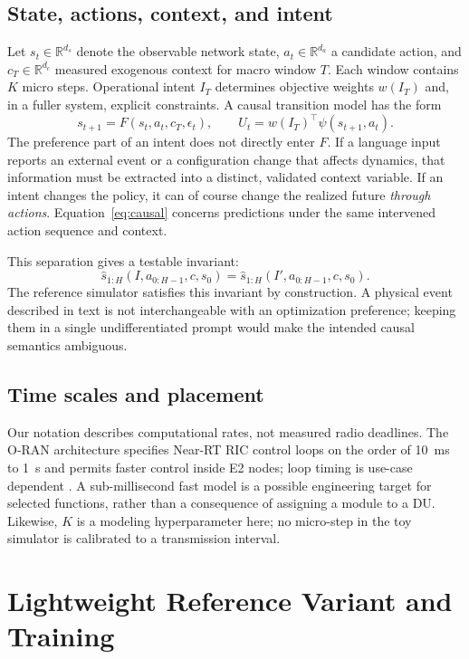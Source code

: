 \documentclass[10pt,twocolumn]{article}
\newcommand{\R}{\mathbb{R}}
\begin{document}
\subsection{State, actions, context, and intent}
Let $s_t\in\R^{d_s}$ denote the observable network state, $a_t\in\R^{d_a}$ a
candidate action, and $c_T\in\R^{d_c}$ measured exogenous context for macro
window $T$. Each window contains $K$ micro steps. Operational intent $I_T$
determines objective weights $w(I_T)$ and, in a fuller system, explicit
constraints. A causal transition model has the form
\begin{equation}
 s_{t+1}=F(s_t,a_t,c_T,\epsilon_t),\qquad
 U_t=w(I_T)^\top\psi(s_{t+1},a_t).
 \label{eq:causal}
\end{equation}
The preference part of an intent does not directly enter $F$. If a language
input reports an external event or a configuration change that affects
dynamics, that information must be extracted into a distinct, validated
context variable. If an intent changes the policy, it can of course change the
realized future \emph{through actions}. Equation~\eqref{eq:causal} concerns
predictions under the same intervened action sequence and context.

This separation gives a testable invariant:
\begin{equation}
 \hat{s}_{1:H}(I,a_{0:H-1},c,s_0)
 =\hat{s}_{1:H}(I',a_{0:H-1},c,s_0).
 \label{eq:invariant}
\end{equation}
The reference simulator satisfies this invariant by construction. A physical
event described in text is not interchangeable with an optimization preference;
keeping them in a single undifferentiated prompt would make the intended causal
semantics ambiguous.

\subsection{Time scales and placement}
Our notation describes computational rates, not measured radio deadlines.
The O-RAN architecture specifies Near-RT RIC control loops on the order of
10~ms to 1~s and permits faster control inside E2 nodes; loop timing is use-case
dependent \cite{oran2026}. A sub-millisecond fast model is a possible engineering
target for selected functions, rather than a consequence of assigning a module
to a DU. Likewise, $K$ is a modeling hyperparameter here; no micro-step in the
toy simulator is calibrated to a transmission interval.

\section{Lightweight Reference Variant and Training}
\end{document}
